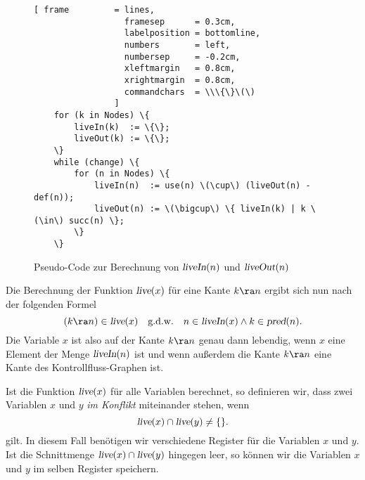 \begin{figure}[!ht]
\centering
\begin{Verbatim}[ frame         = lines, 
                  framesep      = 0.3cm, 
                  labelposition = bottomline,
                  numbers       = left,
                  numbersep     = -0.2cm,
                  xleftmargin   = 0.8cm,
                  xrightmargin  = 0.8cm,
                  commandchars  = \\\{\}\(\)
                ]
    for (k in Nodes) \{
        liveIn(k)  := \{\};
        liveOut(k) := \{\};
    \}
    while (change) \{
        for (n in Nodes) \{
            liveIn(n)  := use(n) \(\cup\) (liveOut(n) - def(n));
            liveOut(n) := \(\bigcup\) \{ liveIn(k) | k \(\in\) succ(n) \};
        \}
    \}
\end{Verbatim} 
\vspace*{-0.3cm}
\caption{Pseudo-Code zur Berechnung von $\textsl{liveIn}(n)$ und $\textsl{liveOut}(n)$}
\label{fig:live-loop}
\end{figure}

\noindent
Die Berechnung der Funktion $\textsl{live}(x)$ f\"ur eine Kante $k \ra n$ ergibt sich nun
nach der folgenden Formel
\[ 
   (k \ra n) \in \textsl{live}(x) \quad \mbox{g.d.w.} \quad
   n \in \textsl{liveIn}(x) \wedge k \in \textsl{pred}(n).
\]
Die Variable $x$ ist also auf der Kante $k \ra n$ genau dann lebendig, wenn $x$ eine
Element der Menge $\textsl{liveIn}(n)$ ist und wenn au{\ss}erdem die Kante $k \ra n$ eine
Kante des Kontrollfluss-Graphen ist.  


Ist die Funktion $\textsl{live}(x)$ f\"ur alle Variablen berechnet, so definieren wir, dass
zwei Variablen $x$ und $y$ \emph{im Konflikt} miteinander stehen, wenn 
\[ \textsl{live}(x) \cap \textsl{live}(y) \not= \{\}.  \]
gilt.  In diesem Fall ben\"otigen wir verschiedene Register f\"ur die Variablen $x$ und $y$.
Ist die Schnittmenge $\textsl{live}(x) \cap \textsl{live}(y)$ hingegen leer, so k\"onnen wir
die Variablen $x$ und $y$ im selben Register speichern.


